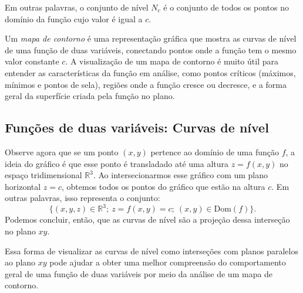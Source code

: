Em outras palavras, o conjunto de nível \( N_c \) é o conjunto de todos os pontos no domínio da função cujo valor é igual a \( c \). 

Um \textit{mapa de contorno} é uma representação gráfica que mostra as curvas de nível de uma função de duas variáveis, conectando pontos onde a função tem o mesmo valor constante $c$. A visualização de um mapa de contorno é muito útil para entender as características da função em análise, como pontos críticos (máximos, mínimos e pontos de sela), regiões onde a função cresce ou decresce, e a forma geral da superfície criada pela função no plano.




\subsection{Funções de duas variáveis: Curvas de nível}


Observe agora que se um ponto $(x, y)$ pertence ao domínio de uma função $f$, a ideia do gráfico é que esse ponto é transladado até uma altura $z = f(x, y)$ no espaço tridimensional $\mathbb{R}^3$. Ao intersecionarmos esse gráfico com um plano horizontal $z = c$, obtemos todos os pontos do gráfico que estão na altura $c$. Em outras palavras, isso representa o conjunto:
\[
\{(x, y, z) \in \mathbb{R}^3;~ z = f(x, y) = c;~ (x, y) \in \text{Dom}(f)\}.
\]
Podemos concluir, então, que as curvas de nível são a projeção dessa interseção no plano $xy$.

Essa forma de visualizar as curvas de nível como interseções com planos paralelos ao plano $xy$ pode ajudar a obter uma melhor compreensão do comportamento geral de uma função de duas variáveis por meio da análise de um mapa de contorno.






